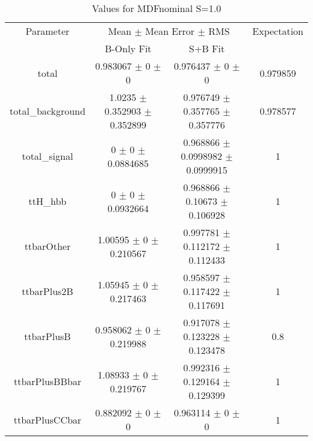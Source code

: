 \begin{table}
\centering
\caption{Values for MDFnominal S=1.0}
\begin{tabular}{cccc}
\toprule
Parameter & \multicolumn{2}{c}{Mean $\pm$ Mean Error $\pm$ RMS} & Expectation\\
 & B-Only Fit & S+B Fit & \\
\midrule
total & \num{0.983067} $\pm$ \num{0} $\pm$ \num{0} & \num{0.976437} $\pm$ \num{0} $\pm$ \num{0} & \num{0.979859}\\
total\_background & \num{1.0235} $\pm$ \num{0.352903} $\pm$ \num{0.352899} & \num{0.976749} $\pm$ \num{0.357765} $\pm$ \num{0.357776} & \num{0.978577}\\
total\_signal & \num{0} $\pm$ \num{0} $\pm$ \num{0.0884685} & \num{0.968866} $\pm$ \num{0.0998982} $\pm$ \num{0.0999915} & \num{1}\\
ttH\_hbb & \num{0} $\pm$ \num{0} $\pm$ \num{0.0932664} & \num{0.968866} $\pm$ \num{0.10673} $\pm$ \num{0.106928} & \num{1}\\
ttbarOther & \num{1.00595} $\pm$ \num{0} $\pm$ \num{0.210567} & \num{0.997781} $\pm$ \num{0.112172} $\pm$ \num{0.112433} & \num{1}\\
ttbarPlus2B & \num{1.05945} $\pm$ \num{0} $\pm$ \num{0.217463} & \num{0.958597} $\pm$ \num{0.117422} $\pm$ \num{0.117691} & \num{1}\\
ttbarPlusB & \num{0.958062} $\pm$ \num{0} $\pm$ \num{0.219988} & \num{0.917078} $\pm$ \num{0.123228} $\pm$ \num{0.123478} & \num{0.8}\\
ttbarPlusBBbar & \num{1.08933} $\pm$ \num{0} $\pm$ \num{0.219767} & \num{0.992316} $\pm$ \num{0.129164} $\pm$ \num{0.129399} & \num{1}\\
ttbarPlusCCbar & \num{0.882092} $\pm$ \num{0} $\pm$ \num{0} & \num{0.963114} $\pm$ \num{0} $\pm$ \num{0} & \num{1}\\
\bottomrule
\end{tabular}
\end{table}